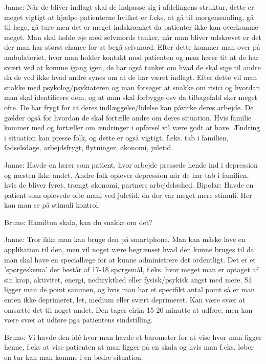 Janne: Når de bliver indlagt skal de indpasse sig i afdelingens struktur, dette er meget vigtigt at hjælpe patienterne hvilket er f.eks. at gå til morgensamling, gå til læge, gå ture men det er meget indskrænket da patienter ikke kan overkomme meget. Man skal holde øje med selvmords tanker, når man bliver udskrevet er det der man har størst chance for at begå selvmord. Efter dette kommer man over på ambulatoriet, hvor man holder kontakt med patienten og man hører tit at de har svært ved at komme igang igen, de har også tanker om hvad de skal sige til andre da de ved ikke hvad andre synes om at de har været indlagt. Efter dette vil man snakke med psykolog/psykiateren og man forsøger at snakke om risici og hvordan man skal identificere dem, og at man skal forbygge osv da tilbagefald sker meget ofte. De har frygt for at deres indlæggelse/lidelse kan påvirke deres arbejde. De gælder også for hvordan de skal fortælle andre om deres situation. Hvis familie kommer med og fortæller om ændringer i opførsel vil være godt at have. Ændring i situation kan presse folk, og dette er også vigtigt, f.eks. tab i  familien, fødselsdage, arbejdsfrygt, flytninger, økonomi, juletid.

Janne: Havde en lærer som patient, hvor arbejde pressede hende ind i depression og næsten ikke andet. Andre folk oplever depression når de har tab i familien, hvis de bliver fyret, trængt økonomi, partners arbejdsløshed. Bipolar: Havde en patient som oplevede ofte mani ved juletid, da der var meget mere stimuli. Her kan man se på stimuli kontrol.

Bruno: Hamilton skala, kan du snakke om det?

Janne: Tror ikke man kan bruge den på smartphone. Man kan måske lave en applikation til den, men vil noget være begrænset hvad den kunne bruges til da man skal have en speciallæge for at kunne administrere det ordentligt. Det er et 'spørgeskema' der består af 17-18 spørgsmål, f.eks. hvor meget man er optaget af sin krop, aktivitet, energi, nedtrykthed eller fysisk/psykisk angst med mere. Så ligger man de point sammen, og hvis man har et specifikt antal point så er man enten ikke deprimeret, let, medium eller svært deprimeret. Kan være svær at omsætte det til noget andet. Den tager cirka 15-20 minutte at udføre, men kan være svær at udføre pga patientens sindstilling.

Bruno: Vi havde den idé hvor man havde et barometer for at vise hvor man ligger henne, f.eks at vise patienten at man ligger på en skala og hvis man f.eks. løber en tur kan man komme i en bedre situation.


